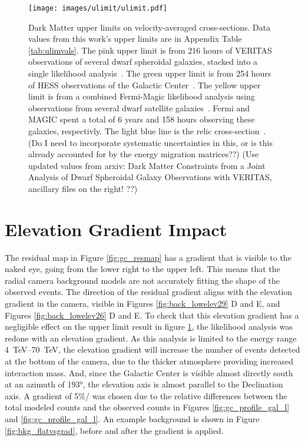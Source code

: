   \begin{figure}[ht]
    \centering
    \texttt{[image: images/ulimit/ulimit.pdf]}
    \caption[Dark Matter Upper Limit Plot]{
      Dark Matter upper limits on velocity-averaged cross-sections.
      Data values from this work's upper limits are in Appendix Table \ref{tab:ulimvals}.
      The pink upper limit is from 216 hours of VERITAS observations of several dwarf spheroidal galaxies, stacked into a single likelihood analysis~\cite{verdsphul}.
      The green upper limit is from 254 hours of HESS observations of the Galactic Center~\cite{hessgcul}.
      The yellow upper limit is from a combined Fermi-Magic likelihood analysis using observations from several dwarf satellite galaxies~\cite{fermagicul}.
      Fermi and MAGIC spent a total of 6 years and 158 hours observing these galaxies, respectivly.
      The light blue line is the relic cross-section~\cite{updatedWIMPRelicCrossSection}.
      {\color{red}(Do I need to incorporate systematic uncertainties in this, or is this already accounted for by the energy migration matrices??)}
      {\color{red}(Use updated values from arxiv: Dark Matter Constraints from a Joint Analysis of Dwarf Spheroidal Galaxy Observations with VERITAS, ancillary files on the right! ??)}
    }
    \label{fig:ulim}
  \end{figure}
  
\FloatBarrier

\section{Elevation Gradient Impact}\label{sec:elevgradient}

  The residual map in Figure \ref{fig:gc_resmap} has a gradient that is visible to the naked eye, going from the lower right to the upper left.
  This means that the radial camera background models are not accurately fitting the shape of the observed events.
  The direction of the residual gradient aligns with the elevation gradient in the camera, visible in Figures \ref{fig:back_lowelev29} D and E, and Figures \ref{fig:back_lowelev26} D and E.
  To check that this elevation gradient has a negligible effect on the upper limit result in figure \ref{fig:ulim}, the likelihood analysis was redone with an elevation gradient.
  As this analysis is limited to the energy range \SIrange{4}{70}{TeV}, the elevation gradient will increase the number of events detected at the bottom of the camera, due to the thicker atmosphere providing increased interaction mass.
  And, since the Galactic Center is visible almost directly south at an azimuth of \ang{193}, the elevation axis is almost parallel to the Declination axis.
  A gradient of 5\%/\degree{} was chosen due to the relative differences between the total modeled counts and the observed counts in Figures \ref{fig:gc_profile_gal_l} and \ref{fig:gc_profile_gal_l}.
  An example background is shown in Figure \ref{fig:bkg_flatvsgrad}, before and after the gradient is applied.
  
